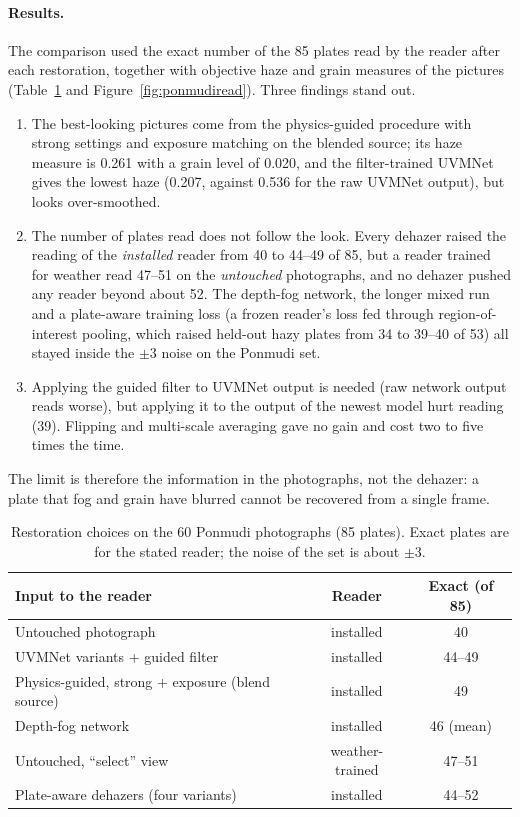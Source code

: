 \paragraph{Results.} The comparison used the exact number of the 85 plates read
by the reader after each restoration, together with objective haze and grain
measures of the pictures (Table~\ref{tab:ponmudi} and
Figure~\ref{fig:ponmudiread}). Three findings stand out.
\begin{enumerate}
  \item The best-looking pictures come from the physics-guided procedure with
        strong settings and exposure matching on the blended source; its haze
        measure is 0.261 with a grain level of 0.020, and the filter-trained
        UVMNet gives the lowest haze (0.207, against 0.536 for the raw UVMNet
        output), but looks over-smoothed.
  \item The number of plates read does not follow the look. Every dehazer
        raised the reading of the \emph{installed} reader from 40 to 44--49 of
        85, but a reader trained for weather read 47--51 on the \emph{untouched}
        photographs, and no dehazer pushed any reader beyond about 52. The
        depth-fog network, the longer mixed run and a plate-aware training loss
        (a frozen reader's loss fed through region-of-interest pooling, which
        raised held-out hazy plates from 34 to 39--40 of 53) all stayed inside
        the $\pm3$ noise on the Ponmudi set.
  \item Applying the guided filter to UVMNet output is needed (raw network
        output reads worse), but applying it to the output of the newest
        model hurt reading (39). Flipping and multi-scale averaging gave no
        gain and cost two to five times the time.
\end{enumerate}
The limit is therefore the information in the photographs, not the dehazer: a
plate that fog and grain have blurred cannot be recovered from a single frame.

\begin{table}[t]
\centering
\caption{Restoration choices on the 60 Ponmudi photographs (85 plates). Exact
plates are for the stated reader; the noise of the set is about $\pm3$.}
\label{tab:ponmudi}
\small
\begin{tabularx}{\textwidth}{@{}Xcc@{}}
\toprule
\textbf{Input to the reader} & \textbf{Reader} & \textbf{Exact (of 85)}\\
\midrule
Untouched photograph & installed & 40\\
UVMNet variants + guided filter & installed & 44--49\\
Physics-guided, strong + exposure (blend source) & installed & 49\\
Depth-fog network & installed & 46 (mean)\\
Untouched, ``select'' view & weather-trained & 47--51\\
Plate-aware dehazers (four variants) & installed & 44--52\\
\bottomrule
\end{tabularx}
\end{table}

